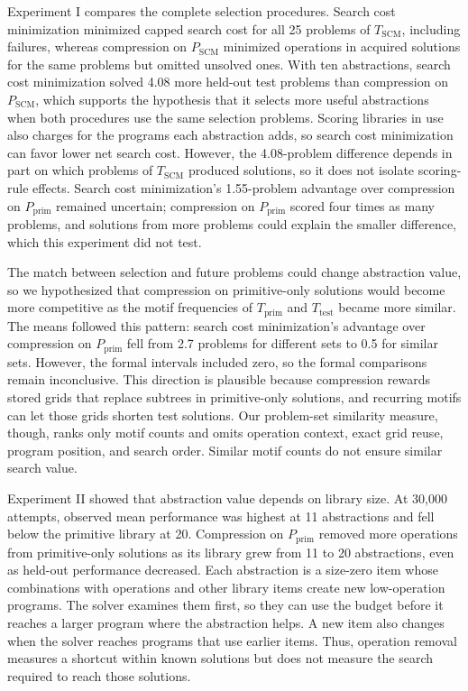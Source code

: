 \documentclass[10pt]{article}
\begin{document}
Experiment I compares the complete selection procedures. Search cost
minimization minimized capped search cost for all 25 problems of
$T_{\mathrm{SCM}}$, including failures, whereas compression on
$P_{\mathrm{SCM}}$ minimized operations in acquired solutions for
the same problems but omitted unsolved ones. With ten abstractions, search
cost minimization solved 4.08 more held-out test problems than compression on
$P_{\mathrm{SCM}}$, which supports the hypothesis that it selects
more useful abstractions when both procedures use the same selection
problems. Scoring libraries in use also charges for the programs each
abstraction adds, so search cost minimization can favor lower net search
cost. However, the
4.08-problem difference depends in part on which problems of
$T_{\mathrm{SCM}}$ produced solutions, so it does not isolate
scoring-rule effects. Search cost minimization's 1.55-problem advantage over
compression on $P_{\mathrm{prim}}$ remained uncertain; compression on
$P_{\mathrm{prim}}$ scored four times as many problems, and solutions
from more problems could explain the smaller difference, which this
experiment did not test.

The match between selection and future problems could change abstraction
value, so we hypothesized that compression on primitive-only
solutions would become more competitive as the motif frequencies of
$T_{\mathrm{prim}}$ and $T_{\mathrm{test}}$ became more
similar. The means followed this pattern: search cost minimization's
advantage over compression on $P_{\mathrm{prim}}$ fell from 2.7
problems for different sets to 0.5 for similar sets. However, the formal
intervals included zero, so the formal comparisons remain inconclusive. This
direction is plausible because compression rewards stored grids that replace
subtrees in primitive-only solutions, and recurring motifs can let those
grids shorten test solutions. Our problem-set similarity measure, though,
ranks only motif counts and omits operation context, exact grid reuse,
program position, and search order. Similar motif counts do not ensure
similar search value.

Experiment II showed that abstraction value depends on library size. At 30,000
attempts, observed mean performance was highest at 11
abstractions and fell below the primitive library at 20. Compression on
$P_{\mathrm{prim}}$ removed more operations from primitive-only
solutions as its library grew
from 11 to 20 abstractions, even as held-out performance decreased. Each
abstraction is a size-zero item whose combinations with operations and other
library items create new low-operation programs. The solver examines them first, so
they can use the budget before it reaches a larger program where the
abstraction helps. A new
item also changes when the solver reaches programs that use earlier items.
Thus, operation removal measures a shortcut within known solutions but does not
measure the search required to reach those solutions.
\end{document}
